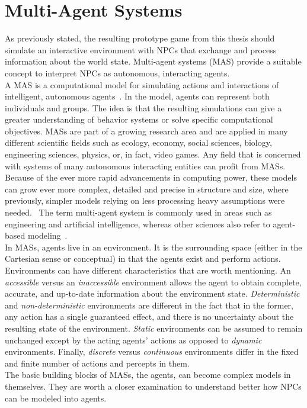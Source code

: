 \section{Multi-Agent Systems}
As previously stated, the resulting prototype game from this thesis should simulate an interactive environment with NPCs that exchange and process information about the world state. Multi-agent systems (MAS) provide a suitable concept to interpret NPCs as autonomous, interacting agents.\\
A MAS is a computational model for simulating actions and interactions of intelligent, autonomous agents~\cite{Wooldridge2009}. In the model, agents can represent both individuals and groups. The idea is that the resulting simulations can give a greater understanding of behavior systems or solve specific computational objectives. MASs are part of a growing research area and are applied in many different scientific fields such as ecology, economy, social sciences, biology, engineering sciences, physics, or, in fact, video games. Any field that is concerned with systems of many autonomous interacting entities can profit from MASs. Because of the ever more rapid advancements in computing power, these models can grow ever more complex, detailed and precise in structure and size, where previously, simpler models relying on less processing heavy assumptions were needed.~\cite{Helbing2012} The term multi-agent system is commonly used in areas such as engineering  and artificial intelligence, whereas other sciences also refer to agent-based modeling~\cite{Niazi2011}.\\
In MASs, agents live in an environment. It is the surrounding space (either in the Cartesian sense or conceptual) in that the agents exist and perform actions. Environments can have different characteristics that are worth mentioning. An \textit{accessible} versus an \textit{inaccessible} environment allows the agent to obtain complete, accurate, and up-to-date information about the environment state. \textit{Deterministic} and \textit{non-deterministic} environments are different in the fact that in the former, any action has a single guaranteed effect, and there is no uncertainty about the resulting state of the environment. \textit{Static} environments can be assumed to remain unchanged except by the acting agents' actions as opposed to \textit{dynamic} environments. Finally, \textit{discrete} versus \textit{continuous} environments differ in the fixed and finite number of actions and percepts in them.~\cite{Wooldridge2009}\\
The basic building blocks of MASs, the agents, can become complex models in themselves. They are worth a closer examination to understand better how NPCs can be modeled into agents.
